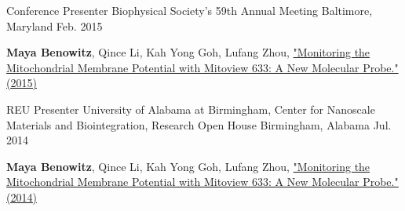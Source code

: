 \begin{cventries}
\cventry
{Conference Presenter} %
{Biophysical Society's 59th Annual Meeting} %
{Baltimore, Maryland} %
{Feb. 2015} %
{ %
\begin{cvitems}
\item {\textbf{Maya Benowitz}, Qince Li, Kah Yong Goh, Lufang Zhou, \href{https://www.researchgate.net/publication/303565847_Monitoring_the_Mitochondrial_Membrane_Potential_with_Mitoview633_A_New_Molecular_Probe}{"Monitoring the Mitochondrial Membrane Potential with Mitoview 633: A New Molecular Probe." (2015)}}
\end{cvitems}
}

\cventry
{REU Presenter} %
{University of Alabama at Birmingham, Center for Nanoscale Materials and Biointegration, Research Open House} %
{Birmingham, Alabama} %
{Jul. 2014} %
{ %
\begin{cvitems}
\item {\textbf{Maya Benowitz}, Qince Li, Kah Yong Goh, Lufang Zhou, \href{https://www.researchgate.net/publication/303565847_Monitoring_the_Mitochondrial_Membrane_Potential_with_Mitoview633_A_New_Molecular_Probe}{"Monitoring the Mitochondrial Membrane Potential with Mitoview 633: A New Molecular Probe." (2014)}}
\end{cvitems}
}
















\end{cventries}
